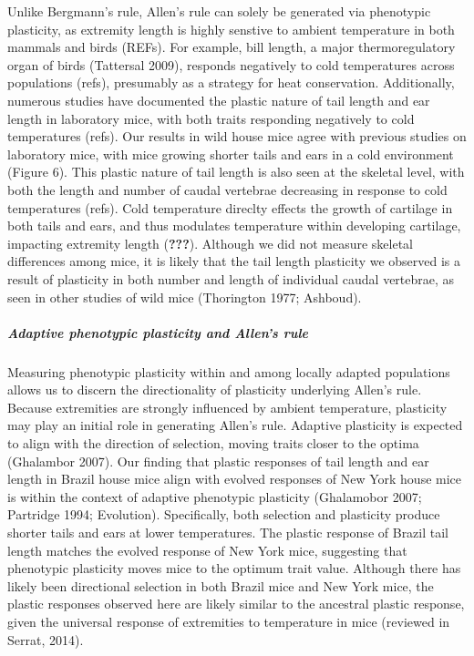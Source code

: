 \documentclass[]{article}
\let\oldsubparagraph\subparagraph
\renewcommand{\subparagraph}[1]{\oldsubparagraph{#1}\mbox{}}
\begin{document}
Unlike Bergmann's rule, Allen's rule can solely be generated via
phenotypic plasticity, as extremity length is highly senstive to ambient
temperature in both mammals and birds (REFs). For example, bill length,
a major thermoregulatory organ of birds (Tattersal 2009), responds
negatively to cold temperatures across populations (refs), presumably as
a strategy for heat conservation. Additionally, numerous studies have
documented the plastic nature of tail length and ear length in
laboratory mice, with both traits responding negatively to cold
temperatures (refs). Our results in wild house mice agree with previous
studies on laboratory mice, with mice growing shorter tails and ears in
a cold environment (Figure 6). This plastic nature of tail length is
also seen at the skeletal level, with both the length and number of
caudal vertebrae decreasing in response to cold temperatures (refs).
Cold temperature direclty effects the growth of cartilage in both tails
and ears, and thus modulates temperature within developing cartilage,
impacting extremity length ({\textbf{???}}). Although we did not measure
skeletal differences among mice, it is likely that the tail length
plasticity we observed is a result of plasticity in both number and
length of individual caudal vertebrae, as seen in other studies of wild
mice (Thorington 1977; Ashboud).

\hypertarget{adaptive-phenotypic-plasticity-and-allens-rule}{%
\subparagraph{\texorpdfstring{\emph{Adaptive phenotypic plasticity and
Allen's
rule}}{Adaptive phenotypic plasticity and Allen's rule}}\label{adaptive-phenotypic-plasticity-and-allens-rule}}

Measuring phenotypic plasticity within and among locally adapted
populations allows us to discern the directionality of plasticity
underlying Allen's rule. Because extremities are strongly influenced by
ambient temperature, plasticity may play an initial role in generating
Allen's rule. Adaptive plasticity is expected to align with the
direction of selection, moving traits closer to the optima (Ghalambor
2007). Our finding that plastic responses of tail length and ear length
in Brazil house mice align with evolved responses of New York house mice
is within the context of adaptive phenotypic plasticity (Ghalamobor
2007; Partridge 1994; Evolution). Specifically, both selection and
plasticity produce shorter tails and ears at lower temperatures. The
plastic response of Brazil tail length matches the evolved response of
New York mice, suggesting that phenotypic plasticity moves mice to the
optimum trait value. Although there has likely been directional
selection in both Brazil mice and New York mice, the plastic responses
observed here are likely similar to the ancestral plastic response,
given the universal response of extremities to temperature in mice
(reviewed in Serrat, 2014).
\end{document}
